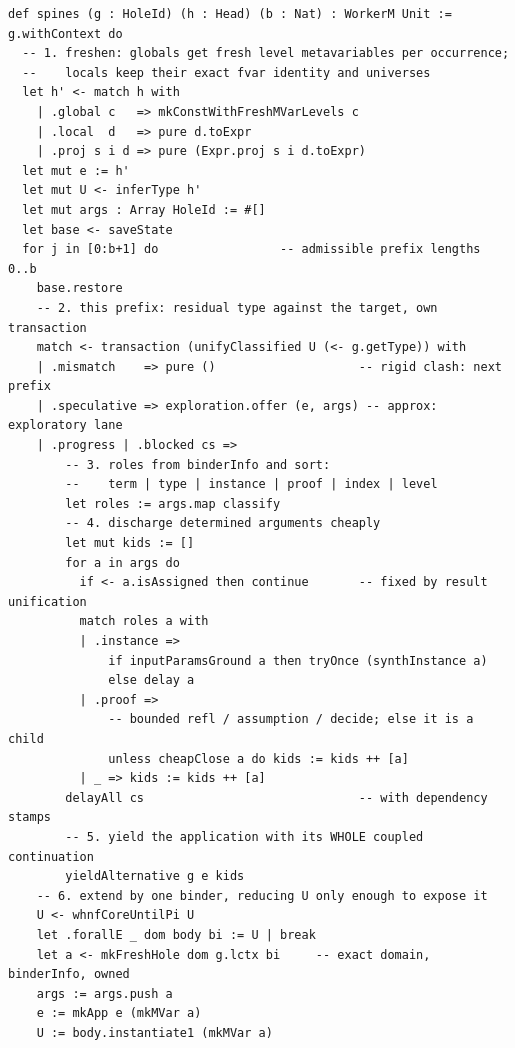 \begin{lstlisting}
def spines (g : HoleId) (h : Head) (b : Nat) : WorkerM Unit := g.withContext do
  -- 1. freshen: globals get fresh level metavariables per occurrence;
  --    locals keep their exact fvar identity and universes
  let h' <- match h with
    | .global c   => mkConstWithFreshMVarLevels c
    | .local  d   => pure d.toExpr
    | .proj s i d => pure (Expr.proj s i d.toExpr)
  let mut e := h'
  let mut U <- inferType h'
  let mut args : Array HoleId := #[]
  let base <- saveState
  for j in [0:b+1] do                 -- admissible prefix lengths 0..b
    base.restore
    -- 2. this prefix: residual type against the target, own transaction
    match <- transaction (unifyClassified U (<- g.getType)) with
    | .mismatch    => pure ()                    -- rigid clash: next prefix
    | .speculative => exploration.offer (e, args) -- approx: exploratory lane
    | .progress | .blocked cs =>
        -- 3. roles from binderInfo and sort:
        --    term | type | instance | proof | index | level
        let roles := args.map classify
        -- 4. discharge determined arguments cheaply
        let mut kids := []
        for a in args do
          if <- a.isAssigned then continue       -- fixed by result unification
          match roles a with
          | .instance =>
              if inputParamsGround a then tryOnce (synthInstance a)
              else delay a
          | .proof =>
              -- bounded refl / assumption / decide; else it is a child
              unless cheapClose a do kids := kids ++ [a]
          | _ => kids := kids ++ [a]
        delayAll cs                              -- with dependency stamps
        -- 5. yield the application with its WHOLE coupled continuation
        yieldAlternative g e kids
    -- 6. extend by one binder, reducing U only enough to expose it
    U <- whnfCoreUntilPi U
    let .forallE _ dom body bi := U | break
    let a <- mkFreshHole dom g.lctx bi     -- exact domain, binderInfo, owned
    args := args.push a
    e := mkApp e (mkMVar a)
    U := body.instantiate1 (mkMVar a)
\end{lstlisting}

